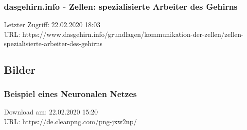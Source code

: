 	\subsubsection{dasgehirn.info - Zellen: spezialisierte Arbeiter des Gehirns}
	\label{subsubsec:dasgehirn:Zellen-Arbeiter_Des_Gehrins}
	Letzter Zugriff: 22.02.2020 18:03\\
	URL: https://www.dasgehirn.info/grundlagen/kommunikation-der-zellen/zellen-spezialisierte-arbeiter-des-gehirns

\subsection{Bilder}
\label{subsec:Bilder_Anhang}
	\subsubsection{Beispiel eines Neuronalen Netzes}
	\label{subsubsec:Beispiel_eines_Neuronalen_Netzes}
	Download am: 22.02.2020 15:20\\
	URL: https://de.cleanpng.com/png-jxw2np/